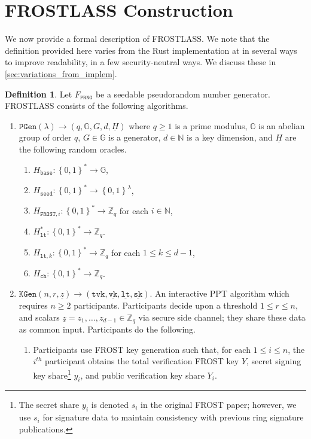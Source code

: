\documentclass[11pt]{article}
\theoremstyle{definition}
\newtheorem{definition}[definition]{Definition}
\newcommand{\G}{\mathbb{G}}
\newcommand{\lt}{\texttt{lt}}
\newcommand{\tvk}{\texttt{tvk}}
\newcommand{\SK}{\underline{\texttt{sk}}}
\newcommand{\VK}{\underline{\texttt{vk}}}
\newcommand{\LT}{\underline{\texttt{lt}}}
\newcommand{\seed}{\texttt{seed}}
\newcommand{\bitstrings}{\left\{0,1\right\}^*}
\newcommand{\Zq}{\mathbb{Z}_q}
\newcommand{\bbn}{\mathbb{N}}
\newcommand{\secpar}{\lambda}
\newcommand{\setup}{\texttt{PGen}}
\newcommand{\keygen}{\texttt{KGen}}
\newcommand{\FROST}{\texttt{FROST}}
\begin{document}
\section{FROSTLASS Construction}

We now provide a formal description of FROSTLASS. We note that the definition provided here varies from the Rust implementation at \cite{SeraiRepo} in several ways to improve readability, in a few security-neutral ways. We discuss these in \cref{sec:variations_from_implem}.

\begin{definition} \label{def:frostlass}
Let $F_{\texttt{PRNG}}$ be a seedable pseudorandom number generator. FROSTLASS consists of the following algorithms. 
\begin{enumerate}
\item $\setup(\secpar) \to (q,\G, G, d, \underline{H})$ where $q \geq 1$ is a prime modulus, $\G$ is an abelian group of order $q$, $G \in \G$ is a generator, $d \in \bbn$ is a key dimension, and $\underline{H}$ are the following random oracles.
\begin{enumerate}
\item $H_{\texttt{base}}:\bitstrings \to \G$,
\item $H_{\seed}:\bitstrings \to \left\{0,1\right\}^\secpar$,
\item $H_{\FROST,i}:\bitstrings \to \Zq$ for each $i \in \mathbb{N}$,
\item $H_{\lt}^*:\bitstrings \to \Zq$.
\item $H_{\lt,k}:\bitstrings \to \Zq$ for each $1 \leq k \leq d-1$,
\item $H_{\texttt{ch}}:\bitstrings \to \Zq$.
\end{enumerate}
\item $\keygen(n, r, \underline{z}) \to (\tvk, \VK, \LT, \SK)$. 
An interactive PPT algorithm which requires $n \geq 2$ participants.  Participants decide upon  a threshold $1 \leq r \leq n$, and scalars $\underline{z} = z_1, \ldots, z_{d-1} \in \Zq$ via secure side channel; they share these data as common input.  Participants do the following. 
\begin{enumerate}
\item Participants use FROST key generation such that, for each $1 \leq i \leq n$, the $i^{th}$ participant obtains the total verification FROST key $Y$, secret signing key share\footnote{The secret share $y_i$ is denoted $s_i$ in the original FROST paper; however, we use $s_i$ for signature data to maintain consistency with previous ring signature publications.}  $y_i$, and public verification key share $Y_i$.

\end{enumerate}
\end{enumerate}
\end{definition}
\end{document}
